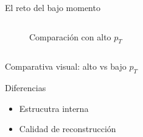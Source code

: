 \documentclass[aspectratio=43]{beamer}
\begin{document}
\begin{frame}{El reto del bajo momento}
\begin{columns}
\begin{column}{0.49\textwidth}
\begin{figure}
        \caption{\small Comparación con alto \texorpdfstring{$p_T$}{pT}}
      \end{figure}
    \end{column}
  \end{columns}
\end{frame}

\begin{frame}{Comparativa visual: alto vs bajo \texorpdfstring{$p_T$}{pT}}
  \vspace{-1.5em}
  \begin{block}{Diferencias}
    \begin{itemize}
      \item Estrucutra interna
      \item Calidad de reconstrucción
    \end{itemize}
  \end{block}
  

\end{frame}
\end{document}
